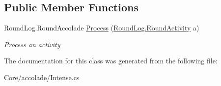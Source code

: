 \subsection*{Public Member Functions}
\begin{DoxyCompactItemize}
\item 
\hypertarget{class_m_b_c_1_1_core_1_1mbc_1_1accolade_1_1_intense_ae3a4c37d563f8c4e1399e75ffdb10866}{Round\-Log.\-Round\-Accolade \hyperlink{class_m_b_c_1_1_core_1_1mbc_1_1accolade_1_1_intense_ae3a4c37d563f8c4e1399e75ffdb10866}{Process} (\hyperlink{class_m_b_c_1_1_core_1_1_round_log_1_1_round_activity}{Round\-Log.\-Round\-Activity} a)}\label{class_m_b_c_1_1_core_1_1mbc_1_1accolade_1_1_intense_ae3a4c37d563f8c4e1399e75ffdb10866}

\begin{DoxyCompactList}\small\item\em Process an activity\end{DoxyCompactList}\end{DoxyCompactItemize}


The documentation for this class was generated from the following file\-:\begin{DoxyCompactItemize}
\item 
Core/accolade/Intense.\-cs\end{DoxyCompactItemize}
